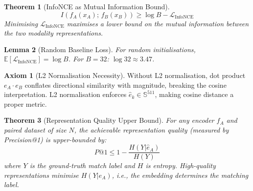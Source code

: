 \documentclass[12pt,a4paper]{article}
\theoremstyle{definition}
\newtheorem{axiom}{Axiom}[section]
\theoremstyle{plain}
\newtheorem{theorem}{Theorem}[section]
\newtheorem{lemma}[theorem]{Lemma}
\theoremstyle{remark}
\newcommand{\Sph}{\mathbb{S}}
\newcommand{\EE}{\mathbb{E}}
\begin{document}
\begin{theorem}[InfoNCE as Mutual Information Bound]
\[
  I(f_A(x_A);\, f_B(x_B)) \ge \log B - \mathcal{L}_{\text{InfoNCE}}
\]
Minimising $\mathcal{L}_{\text{InfoNCE}}$ maximises a lower bound on the mutual information between the two modality representations.
\end{theorem}

\begin{lemma}[Random Baseline Loss]
For random initialisations, $\EE[\mathcal{L}_{\text{InfoNCE}}] = \log B$. For $B=32$: $\log 32 \approx 3.47$.
\end{lemma}

\begin{axiom}[L2 Normalisation Necessity]
\label{ax:l2}
Without L2 normalisation, dot product $e_A \cdot e_B$ conflates directional similarity with magnitude, breaking the cosine interpretation. L2 normalisation enforces $\hat{e}_k \in \Sph^{511}$, making cosine distance a proper metric.
\end{axiom}

\begin{theorem}[Representation Quality Upper Bound]
For any encoder $f_A$ and paired dataset of size $N$, the achievable representation quality (measured by Precision@1) is upper-bounded by:
\[
  P@1 \le 1 - \frac{H(Y|\hat{e}_A)}{H(Y)}
\]
where $Y$ is the ground-truth match label and $H$ is entropy. High-quality representations minimise $H(Y|\hat{e}_A)$, i.e., the embedding determines the matching label.
\end{theorem}
\end{document}
